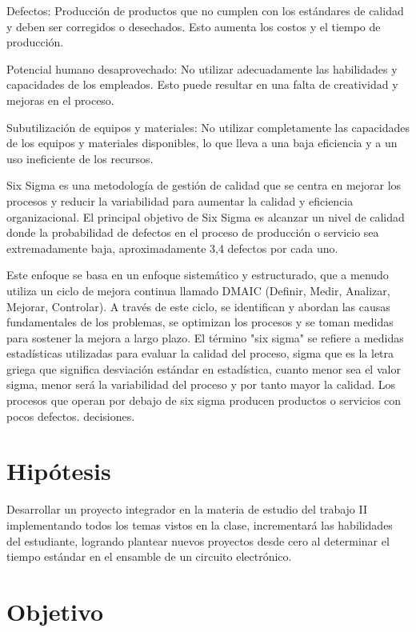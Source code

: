     Defectos: Producción de productos que no cumplen con los estándares de calidad y deben ser corregidos o desechados. Esto aumenta los costos y el tiempo de producción.
    
    Potencial humano desaprovechado: No utilizar adecuadamente las habilidades y capacidades de los empleados. Esto puede resultar en una falta de creatividad y mejoras en el proceso.
    
    Subutilización de equipos y materiales: No utilizar completamente las capacidades de los equipos y materiales disponibles, lo que lleva a una baja eficiencia y a un uso ineficiente de los recursos.
    
    
    Six Sigma es una metodología de gestión de calidad que se centra en mejorar los procesos y reducir la variabilidad para aumentar la calidad y eficiencia organizacional. El principal objetivo de Six Sigma es alcanzar un nivel de calidad donde la probabilidad de defectos en el proceso de producción o servicio sea extremadamente baja, aproximadamente 3,4 defectos por cada uno.
    
    
    Este enfoque se basa en un enfoque sistemático y estructurado, que a menudo utiliza un ciclo de mejora continua llamado DMAIC (Definir, Medir, Analizar, Mejorar, Controlar). A través de este ciclo, se identifican y abordan las causas fundamentales de los problemas, se optimizan los procesos y se toman medidas para sostener la mejora a largo plazo. El término "six sigma" se refiere a medidas estadísticas utilizadas para evaluar la calidad del proceso, sigma que es la letra griega que significa desviación estándar en estadística, cuanto menor sea el valor sigma, menor será la variabilidad del proceso y por tanto mayor la calidad. Los procesos que operan por debajo de six sigma producen productos o servicios con pocos defectos. decisiones.
    
    
    
     
    
    \section{Hipótesis}
    
    Desarrollar un proyecto integrador en la materia de estudio del trabajo II implementando todos los temas vistos en la clase, incrementará las habilidades del estudiante, logrando plantear nuevos proyectos desde cero al determinar el tiempo estándar en el ensamble de un circuito electrónico.
    
    \section{Objetivo}
    
